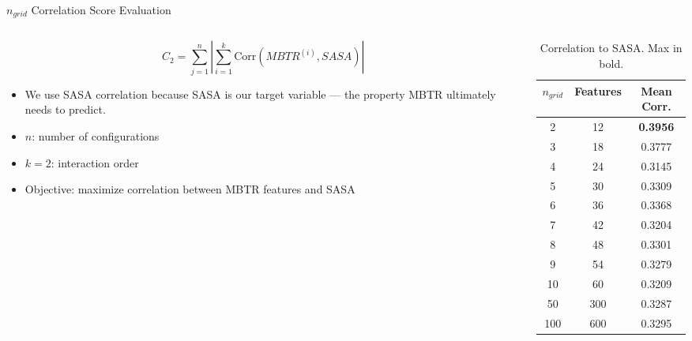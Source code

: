 \documentclass[aspectratio=169]{beamer}
\begin{document}
\begin{frame}{$n_{grid}$ Correlation Score Evaluation}
\begin{columns}[T]

\begin{column}{0.55\textwidth}
\[
C_2 = \sum_{j=1}^{n}\left|\sum_{i=1}^{k} \mathrm{Corr}\left(MBTR^{(i)}, SASA\right)\right|
\]
\begin{itemize}
    \item We use SASA correlation because SASA is our target variable — the property MBTR ultimately needs to predict.
    \item $n$: number of configurations
    \item $k = 2$: interaction order
    \item Objective: maximize correlation between MBTR features and SASA
\end{itemize}
\end{column}

\begin{column}{0.55\textwidth}
\begin{table}[]
    \centering
    \small
    \begin{tabular}{|c|c|c|}
    \hline
    \rowcolor{gray}
         $n_{grid}$ & Features & Mean Corr. \\
         \hline
         2 & 12 & \textbf{0.3956} \\
         \hline
         3 & 18 & 0.3777 \\
         \hline
         4 & 24 & 0.3145 \\
         \hline
         5 & 30 & 0.3309 \\
         \hline
         6 & 36 & 0.3368 \\
         \hline
         7 & 42 & 0.3204 \\
         \hline
         8 & 48 & 0.3301 \\
         \hline
         9 & 54 & 0.3279 \\
         \hline
         10 & 60 & 0.3209 \\
         \hline
         50 & 300 & 0.3287 \\
         \hline
         100 & 600 & 0.3295 \\
         \hline
    \end{tabular}
    \caption{Correlation to SASA. Max in bold.}
    \label{tab:ngrid_correlation}
\end{table}
\end{column}

\end{columns}
\end{frame}
\end{document}
